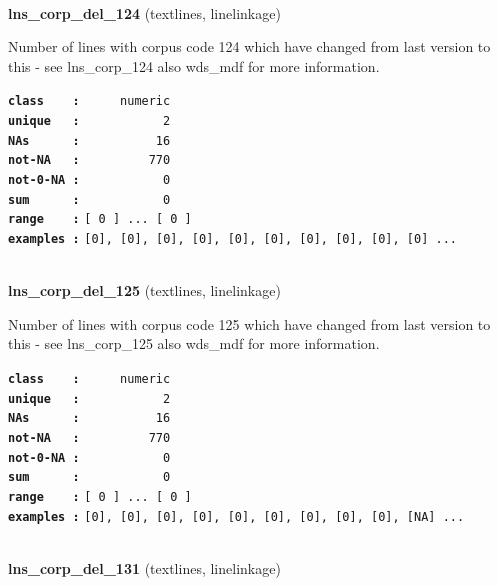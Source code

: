 \documentclass[]{article}
\begin{document}
~

\textbf{lns\_corp\_del\_124} (textlines, linelinkage)

Number of lines with corpus code 124 which have changed from last
version to this - see lns\_corp\_124 also wds\_mdf for more information.

\textbf{\texttt{class\ \ \ \ :}} \texttt{~~~~~numeric}\\
\textbf{\texttt{unique\ \ \ :}} \texttt{~~~~~~~~~~~2}\\
\textbf{\texttt{NAs\ \ \ \ \ \ :}} \texttt{~~~~~~~~~~16}\\
\textbf{\texttt{not-NA\ \ \ :}} \texttt{~~~~~~~~~770}\\
\textbf{\texttt{not-0-NA\ :}} \texttt{~~~~~~~~~~~0}\\
\textbf{\texttt{sum\ \ \ \ \ \ :}} \texttt{~~~~~~~~~~~0}\\
\textbf{\texttt{range\ \ \ \ :}}
\texttt{{[}\ 0\ {]}\ ...\ {[}\ 0\ {]}}\\
\textbf{\texttt{examples\ :}}
\texttt{{[}0{]},\ {[}0{]},\ {[}0{]},\ {[}0{]},\ {[}0{]},\ {[}0{]},\ {[}0{]},\ {[}0{]},\ {[}0{]},\ {[}0{]}\ ...}\\

~

\textbf{lns\_corp\_del\_125} (textlines, linelinkage)

Number of lines with corpus code 125 which have changed from last
version to this - see lns\_corp\_125 also wds\_mdf for more information.

\textbf{\texttt{class\ \ \ \ :}} \texttt{~~~~~numeric}\\
\textbf{\texttt{unique\ \ \ :}} \texttt{~~~~~~~~~~~2}\\
\textbf{\texttt{NAs\ \ \ \ \ \ :}} \texttt{~~~~~~~~~~16}\\
\textbf{\texttt{not-NA\ \ \ :}} \texttt{~~~~~~~~~770}\\
\textbf{\texttt{not-0-NA\ :}} \texttt{~~~~~~~~~~~0}\\
\textbf{\texttt{sum\ \ \ \ \ \ :}} \texttt{~~~~~~~~~~~0}\\
\textbf{\texttt{range\ \ \ \ :}}
\texttt{{[}\ 0\ {]}\ ...\ {[}\ 0\ {]}}\\
\textbf{\texttt{examples\ :}}
\texttt{{[}0{]},\ {[}0{]},\ {[}0{]},\ {[}0{]},\ {[}0{]},\ {[}0{]},\ {[}0{]},\ {[}0{]},\ {[}0{]},\ {[}NA{]}\ ...}\\

~

\textbf{lns\_corp\_del\_131} (textlines, linelinkage)
\end{document}
